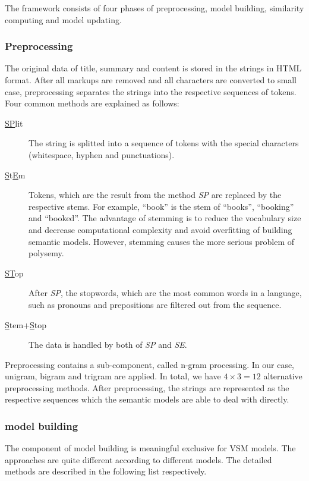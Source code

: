 The framework consists of four phases of preprocessing, model building, similarity computing and model updating. 

\subsubsection{Preprocessing}
The original data of title, summary and content is stored in the strings in HTML format. After all markups are removed and all characters are converted to small case, preprocessing separates the strings into the respective sequences of tokens. Four common methods are explained as follows:

\begin{description}
\item[\underline{SP}lit] The string is splitted into a sequence of tokens with the special characters (whitespace, hyphen and punctuations). 
\item[\underline{S}t\underline{E}m] Tokens, which are the result from the method \textit{SP} are replaced by the respective stems. For example, ``book'' is the stem of ``books'', ``booking'' and ``booked''. The advantage of stemming is to reduce the vocabulary size and decrease computational complexity and avoid overfitting of building semantic models. However, stemming causes the more serious problem of polysemy. 
\item[\underline{ST}op] After \textit{SP}, the stopwords, which are the most common words in a language, such as pronouns and prepositions are filtered out from the sequence. 
\item[\underline{S}tem+\underline{S}top] The data is handled by both of \textit{SP} and \textit{SE}. 
\end{description}

Preprocessing contains a sub-component, called n-gram processing. In our case, unigram, bigram and trigram are applied. In total, we have $4 \times 3 = 12$ alternative preprocessing methods. After preprocessing, the strings are represented as the respective sequences which the semantic models are able to deal with directly. 

\subsubsection{model building}
The component of model building is meaningful exclusive for VSM models. The approaches are quite different according to different models. The detailed methods are described in the following list respectively.

